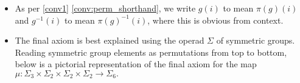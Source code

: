 \begin{rem}
\begin{itemize}
\item As per \cref{conv1} \eqref{conv:perm_shorthand}, we write $g(i)$ to mean $\pi(g)(i)$ and $g^{-1}(i)$ to mean $\pi(g)^{-1}(i)$, where this is obvious from context.  
\item The final axiom is best explained using the operad $\Sigma$ of symmetric groups. Reading symmetric group elements as permutations from top to bottom, below is a pictorial representation of the final axiom for the map $\mu \colon \Sigma_{3} \times \Sigma_{2} \times \Sigma_{2} \times \Sigma_{2} \rightarrow \Sigma_{6}.$

\end{itemize}
\end{rem}
